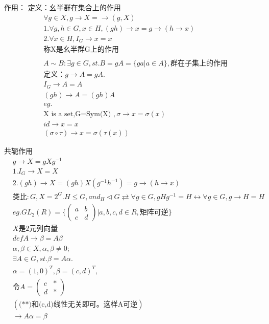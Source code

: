 \documentclass[12pt, a4paper]{article}  %
\begin{document}
作用：
定义：幺半群在集合上的作用
\begin{align}
    &\forall g\in X,g\rightarrow X=\rightarrow (g,X)\\
    &1.\forall g,h\in G,x\in H,(gh)\rightarrow x=g\rightarrow (h\rightarrow x)\\
    &2.\forall x\in H,I_G\rightarrow x=x\\
    &\text{称X是幺半群G上的作用}\\
    &\\
    &A\sim B:\exists g\in G,st. B=gA=\{ga|a\in A\},\text{群在子集上的作用}\\
    &\text{定义：}g\rightarrow A=gA.\\
    &I_G\rightarrow A=A\\
    &(gh)\rightarrow A=(gh)A\\
    &eg.\\
    &\text{X is a set,G=Sym(X) },\sigma\rightarrow x=\sigma(x)\\
    &id\rightarrow x=x\\
    &(\sigma \circ \tau)\rightarrow x=\sigma(\tau(x))
\end{align}

共轭作用
\begin{align}
    &g\rightarrow X=gXg^{-1}\\
    &1.I_G\rightarrow X=X\\
    &2.(gh)\rightarrow X=(gh)X(g^{-1}h^{-1})=g\rightarrow(h\rightarrow x)\\
    &\text{类比}:G,X=2^G.H\leqslant G,and_H\lhd G\rightleftarrows \forall g\in G,gHg^{-1}=H\leftrightarrow \forall g \in G,g\rightarrow H=H\\
    &eg.GL_2(R)=\{\begin{pmatrix}
        a&b\\
        c&d
    \end{pmatrix}|a,b,c,d\in R,\text{矩阵可逆}\}\\
    &X\text{是2元列向量}\\
    &def  A\rightarrow \beta=A\beta\\
    &\alpha ,\beta\in X,\alpha ,\beta \neq 0;\\
    &\exists A\in G,st. \beta=A\alpha.\\
    &\alpha =(1,0)^T,\beta=(c,d)^T,\\
    &\text{令}A=\begin{pmatrix}
        c&*\\
        d&*
    \end{pmatrix}\\
    &(\text{(**)和(c,d)线性无关即可。这样A可逆})\\
    &\rightarrow A\alpha=\beta
\end{align}
\end{document}
